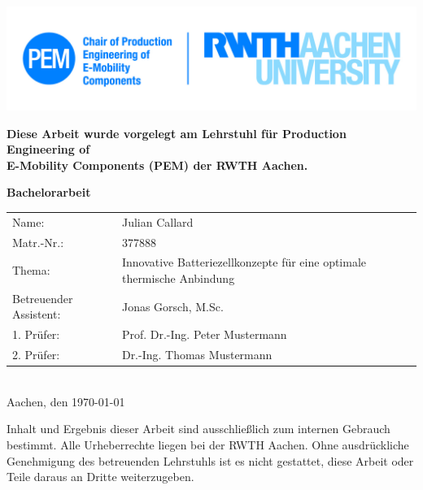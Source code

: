 




\begin{titlepage}
\flushright
\vspace*{-2.3cm}
{
\includegraphics[scale=0.7]{figs/pem_logo.png}}
\\
\centering
\vspace{0.5cm}
\begin{doublespacing}
	\textbf{Diese Arbeit wurde vorgelegt am Lehrstuhl für Production Engineering of\\ E-Mobility Components (PEM) der RWTH Aachen.}\\
\end{doublespacing}
\vspace{1.5cm}
\textbf{\LARGE Bachelorarbeit}
\\
\flushleft
\vspace{1.7cm}
\Large
\begin{tabular}{lp{10cm}}
	\rule[-2ex]{0pt}{2.5ex} Name: & Julian Callard \\ 
	\rule[-6ex]{0pt}{2.5ex} Matr.-Nr.: & 377888 \\ 
	\rule[-16ex]{0pt}{2.5ex} Thema: & Innovative Batteriezellkonzepte für eine optimale thermische Anbindung \\ 
	\rule[-6ex]{0pt}{2.5ex} Betreuender Assistent: & Jonas Gorsch, M.Sc. \\ 
	\rule[-2ex]{0pt}{2.5ex} 1. Prüfer: & Prof. Dr.-Ing. Peter Mustermann \\ 
	\rule[-2ex]{0pt}{2.5ex} 2. Prüfer: & Dr.-Ing. Thomas Mustermann \\ 
\end{tabular} 
\\
\vspace{1.2cm}
\hspace{0.15cm}
Aachen, den \today
\\
\vspace{1.4cm}
\hspace{0.15cm}
\begin{minipage}{0.98\textwidth}
	\large
	Inhalt und Ergebnis dieser Arbeit sind ausschließlich zum internen Gebrauch\\ bestimmt. Alle Urheberrechte liegen bei der RWTH Aachen. Ohne ausdrückliche\\ Genehmigung des betreuenden Lehrstuhls ist es nicht gestattet, diese Arbeit oder Teile daraus an Dritte weiterzugeben.
\end{minipage}
\end{titlepage}	
\newpage
\thispagestyle{empty} %
\mbox{}

